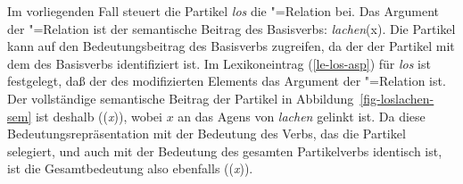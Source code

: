 Im vorliegenden Fall steuert die Partikel \emph{los} die "=Relation bei.
Das Argument der "=Relation ist der semantische Beitrag des Basisverbs:
\emph{lachen}(x). Die Partikel kann auf den Bedeutungsbeitrag
des Basisverbs zugreifen, da der \modw der Partikel mit dem \synsemw des Basisverbs 
identifiziert ist. Im Lexikoneintrag (\ref{le-los-asp}) für \emph{los} ist festgelegt,
daß der \contw des modifizierten Elements das Argument der "=Relation ist.
Der vollständige semantische Beitrag der Partikel in Abbildung~\ref{fig-loslachen-sem} 
ist deshalb ((\emph{x})), wobei $x$ an das Agens von \emph{lachen} gelinkt ist.
Da diese Bedeutungsrepräsentation mit der Bedeutung des Verbs, das die Partikel selegiert,
und auch mit der Bedeutung des gesamten Partikelverbs identisch ist, ist die Gesamtbedeutung
also ebenfalls ((\emph{x})).

